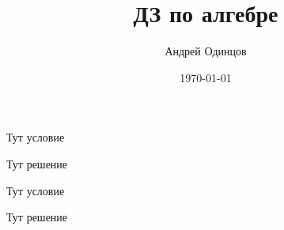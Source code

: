 \documentclass[a4paper,12pt]{article}
\author{Андрей Одинцов}
\title{ДЗ по алгебре}
\date{\today}
\begin{document}
\maketitle

\begin{problem}[1] Тут условие
\begin{solution} Тут решение
\end{solution}
\end{problem}


\begin{problem}[2] Тут условие
\begin{solution} Тут решение
\end{solution}
\end{problem}
\end{document}
